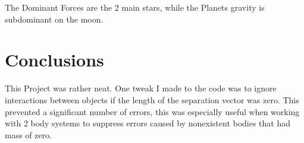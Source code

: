 \documentclass{article}
\begin{document}
The Dominant Forces are the 2 main stars, while the Planets gravity is subdominant on the moon.


\section{Conclusions}

This Project was rather neat. One tweak I made to the code was to ignore interactions between objects if the length of the separation vector was zero. This prevented a significant number of  errors, this was especially useful when working with 2 body systems to suppress errors caused by nonexistent bodies that had mass of zero. 
\end{document}
